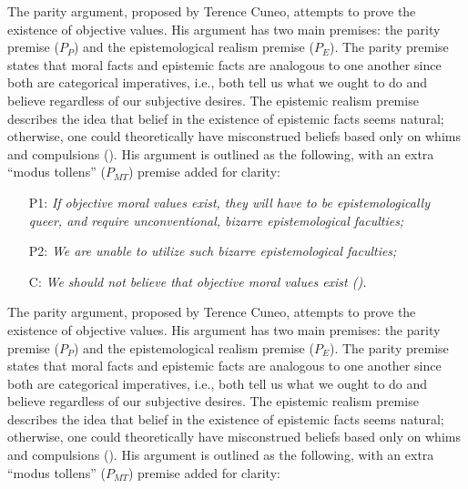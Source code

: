 \documentclass[12pt, a4paper, twoside]{article}
\begin{document}
The parity argument, proposed by Terence Cuneo, attempts to prove the existence of objective values. His argument has two main premises: the parity premise ($P_P$) and the epistemological realism premise ($P_E$). The parity premise states that moral facts and epistemic facts are analogous to one another since both are categorical imperatives, i.e., both tell us what we ought to do and believe regardless of our subjective desires. The epistemic realism premise describes the idea that belief in the existence of epistemic facts seems natural; otherwise, one could theoretically have misconstrued beliefs based only on whims and compulsions (\cite[pp.\ 52–62]{cuneo2010normative}). His argument is outlined as the following, with an extra “modus tollens” ($P_{MT}$) premise added for clarity:
\begin{enumerate}

	\item[P1:] \textit{If objective moral values exist, they will have to be epistemologically queer, and require unconventional, bizarre epistemological faculties;}

	\item[P2:] \textit{We are unable to utilize such bizarre epistemological faculties;}

	\item[C:] \textit{We should not believe that objective moral values exist (\cites[pp.\ 38–41]{mackie1978ethics}[pp.\ 1–2]{lillehammer2019queerness}).}

\end{enumerate}

The parity argument, proposed by Terence Cuneo, attempts to prove the existence of objective values. His argument has two main premises: the parity premise ($P_P$) and the epistemological realism premise ($P_E$). The parity premise states that moral facts and epistemic facts are analogous to one another since both are categorical imperatives, i.e., both tell us what we ought to do and believe regardless of our subjective desires. The epistemic realism premise describes the idea that belief in the existence of epistemic facts seems natural; otherwise, one could theoretically have misconstrued beliefs based only on whims and compulsions (\cite[pp.\ 52–62]{cuneo2010normative}). His argument is outlined as the following, with an extra “modus tollens” ($P_{MT}$) premise added for clarity: 
\end{document}
